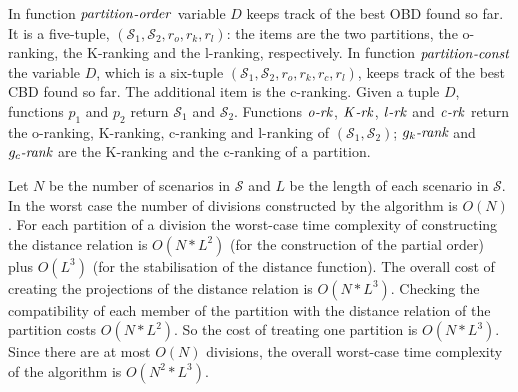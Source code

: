 In function $\mathit{partition}\emph{-}\mathit{order}$ variable
$D$ keeps track of the best OBD found so far.
It is a five-tuple, $(\mathcal{S}_1,\mathcal{S}_2,r_o,r_k,r_l)$:
the items are the two partitions,
the o-ranking, the K-ranking and the l-ranking,
respectively.
In function $\mathit{partition}\emph{-}\mathit{const}$ the variable
$D$, which is a
six-tuple $(\mathcal{S}_1,\mathcal{S}_2,r_o,r_k,r_c,r_l)$, keeps track
of the best CBD found so far.
The additional item is the  c-ranking.
Given a tuple $D$,
functions $p_1$ and $p_2$ return
$\mathcal{S}_1$ and $\mathcal{S}_2$.
Functions
$\mathit{o}\emph{-}\mathit{rk}$,
$\mathit{K}\emph{-}\mathit{rk}$,
$\mathit{l}\emph{-}\mathit{rk}$ and
$\mathit{c}\emph{-}\mathit{rk}$
return the
o-ranking, K-ranking, c-ranking and l-ranking of
$(\mathcal{S}_1,\mathcal{S}_2)$;
${g_{k}}\emph{-rank}$ and ${g_{c}}\emph{-rank}$
are the K-ranking and the c-ranking
of a partition.

Let $N$ be the number of scenarios in $\mathcal{S}$ and $L$ be the
length of each scenario in $\mathcal{S}$.
In the worst case the number of divisions constructed by the algorithm
is $O(N)$.
For each partition of a division the worst-case time complexity of
constructing the distance
relation is $O(N*L^2)$ (for the construction of the partial order)
plus $O(L^3)$ (for the stabilisation of the distance function).
The overall cost of creating the projections of the distance relation is
$O(N*L^3)$.
Checking the compatibility of each member of the
partition with the distance relation of the partition costs $O(N*L^2)$.
So the cost of treating one partition is
$O(N*L^3)$. Since there are at
most $O(N)$ divisions,
the overall
worst-case time complexity of the algorithm is $O(N^2*L^3)$.
